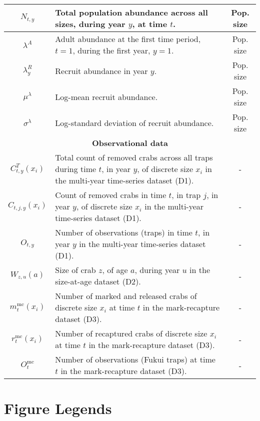 \documentclass{article}
\begin{document}
\begin{table}[ht]
\begin{tabular}{||c p{9cm} c||}
 \hline
 $N_{t,y}$ & Total population abundance across all sizes, during year $y$, at time $t$. & Pop. size \\
 \hline
 $\lambda^A$ & Adult abundance at the first time period, $t=1$, during the first year, $y=1$. & Pop. size \\
 \hline
 $\lambda^R_y$ & Recruit abundance in year $y$. & Pop. size \\
 \hline
 $\mu^{\lambda}$ & Log-mean recruit abundance. & Pop. size \\
 \hline
 $\sigma^{\lambda}$ & Log-standard deviation of recruit abundance. & Pop. size \\
 \hline\hline
 \multicolumn{3}{||c||}{\textbf{Observational data}} \\ 
 \hline
 $C^T_{t,y}(x_i)$ & Total count of removed crabs across all traps during time $t$, in year $y$, of discrete size $x_i$ in the multi-year time-series dataset (D1). & - \\ 
 \hline
 $C_{t,j,y}(x_i)$ & Count of removed crabs in time $t$, in trap $j$, in year $y$, of discrete size $x_i$ in the multi-year time-series dataset (D1). & - \\
 \hline
 $O_{t,y}$ & Number of observations (traps) in time $t$, in year $y$ in the multi-year time-series dataset (D1). & - \\
 \hline
 $W_{z, u}(a)$ & Size of crab $z$, of age $a$, during year $u$ in the size-at-age dataset (D2). & - \\
 \hline
 $m^{\text{mc}}_t(x_i)$ & Number of marked and released crabs of discrete size $x_i$ at time $t$ in the mark-recapture dataset (D3). & - \\
 \hline
 $r^{\text{mc}}_t(x_i)$ & Number of recaptured crabs of discrete size $x_i$ at time $t$ in the mark-recapture dataset (D3). & - \\
 \hline
 $O^{\text{mc}}_t$ & Number of observations (Fukui traps) at time $t$ in the mark-recapture dataset (D3). & - \\
 \hline
 \end{tabular}
 \end{table}


\section{Figure Legends}
\end{document}
